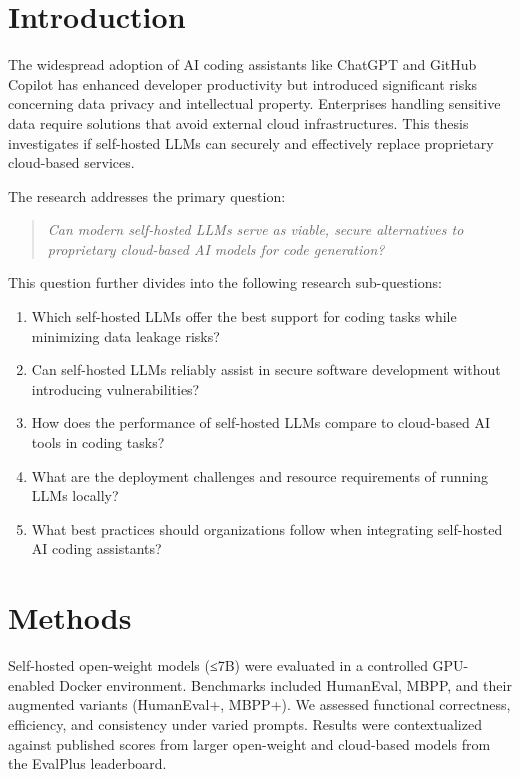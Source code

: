 \documentclass[a0,portrait,english]{hogent-poster}
\begin{document}
\begin{multicols}{2} %

	\section{Introduction}
	The widespread adoption of AI coding assistants like ChatGPT and GitHub Copilot has enhanced developer productivity but introduced significant risks concerning data privacy and intellectual property. Enterprises handling sensitive data require solutions that avoid external cloud infrastructures. This thesis investigates if self-hosted LLMs can securely and effectively replace proprietary cloud-based services.

	The research addresses the primary question:

	\begin{quote}
		\textit{Can modern self-hosted LLMs serve as viable, secure alternatives to proprietary cloud-based AI models for code generation?}
	\end{quote}
	\label{rq:main}

	This question further divides into the following research sub-questions:

	\begin{enumerate}[label=SQ\arabic*., ref=SQ\arabic*]
		\item \label{sq:best-choice} Which self-hosted LLMs offer the best support for coding tasks while minimizing data leakage risks?
		\item \label{sq:secure-dev} Can self-hosted LLMs reliably assist in secure software development without introducing vulnerabilities?
		\item \label{sq:performance} How does the performance of self-hosted LLMs compare to cloud-based AI tools in coding tasks?
		\item \label{sq:deployment} What are the deployment challenges and resource requirements of running LLMs locally?
		\item \label{sq:best-practices} What best practices should organizations follow when integrating self-hosted AI coding assistants?
	\end{enumerate}

	\section{Methods}
	Self-hosted open-weight models (≤7B) were evaluated in a controlled GPU-enabled Docker environment. Benchmarks included HumanEval, MBPP, and their augmented variants (HumanEval+, MBPP+). We assessed functional correctness, efficiency, and consistency under varied prompts. Results were contextualized against published scores from larger open-weight and cloud-based models from the EvalPlus leaderboard.


\end{multicols}
\end{document}
